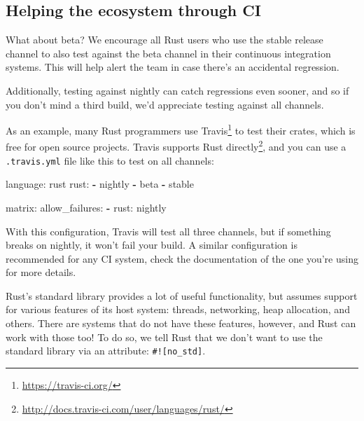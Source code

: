 \documentclass[a4paper,]{book}
\newenvironment{Shaded}{\begin{snugshade}}{\end{snugshade}}
\newcommand{\KeywordTok}[1]{\textcolor[rgb]{0.13,0.29,0.53}{\textbf{{#1}}}}
\newcommand{\FunctionTok}[1]{\textcolor[rgb]{0.00,0.00,0.00}{{#1}}}
\newcommand{\NormalTok}[1]{{#1}}
\renewcommand{\href}[2]{#2\footnote{\url{#1}}}
\begin{document}
\subsection{Helping the ecosystem through
CI}\label{helping-the-ecosystem-through-ci}

What about beta? We encourage all Rust users who use the stable release
channel to also test against the beta channel in their continuous
integration systems. This will help alert the team in case there's an
accidental regression.

Additionally, testing against nightly can catch regressions even sooner,
and so if you don't mind a third build, we'd appreciate testing against
all channels.

As an example, many Rust programmers use
\href{https://travis-ci.org/}{Travis} to test their crates, which is
free for open source projects. Travis
\href{http://docs.travis-ci.com/user/languages/rust/}{supports Rust
directly}, and you can use a \texttt{.travis.yml} file like this to test
on all channels:

\begin{Shaded}
\begin{Highlighting}[]
\FunctionTok{language:} \NormalTok{rust}
\FunctionTok{rust:}
  \KeywordTok{-} \NormalTok{nightly}
  \KeywordTok{-} \NormalTok{beta}
  \KeywordTok{-} \NormalTok{stable}

\FunctionTok{matrix:}
  \FunctionTok{allow_failures:}
    \KeywordTok{-} \FunctionTok{rust:} \NormalTok{nightly}
\end{Highlighting}
\end{Shaded}

With this configuration, Travis will test all three channels, but if
something breaks on nightly, it won't fail your build. A similar
configuration is recommended for any CI system, check the documentation
of the one you're using for more details.


Rust's standard library provides a lot of useful functionality, but
assumes support for various features of its host system: threads,
networking, heap allocation, and others. There are systems that do not
have these features, however, and Rust can work with those too! To do
so, we tell Rust that we don't want to use the standard library via an
attribute: \texttt{\#!{[}no\_std{]}}.
\end{document}
